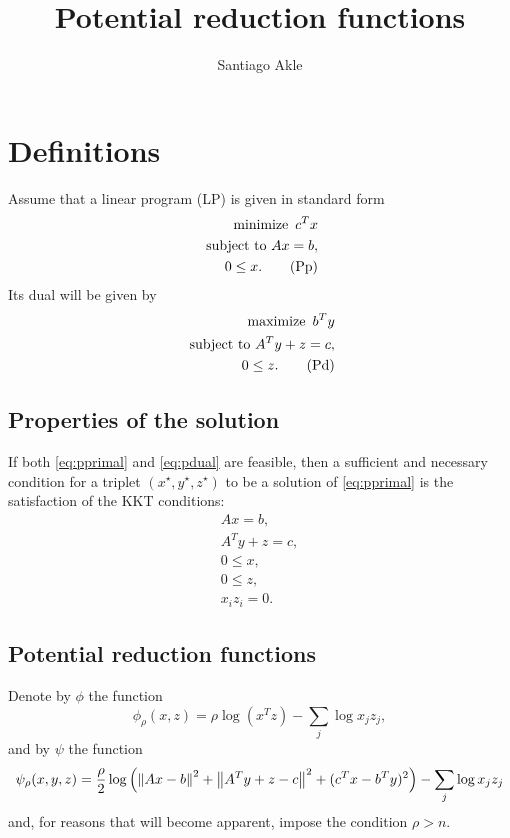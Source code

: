 \documentclass{article}
\title{Potential reduction functions}
\author{Santiago Akle}
\begin{document}
\maketitle
\section{Definitions}
Assume that a linear program (LP) is given in standard form
\begin{align*}
  \operatorname{minimize}\  c^Tx\\
  \text{ subject to } Ax = b,\\
  0 \leq x.
  \label{eq:pprimal}
  \tag{Pp}
\end{align*}
Its dual will be given by  
\begin{align*}
  \operatorname{maximize}\  b^Ty\\
  \text{ subject to } A^Ty + z = c,\\
  0 \leq z.
  \label{eq:pdual}
  \tag{Pd}
\end{align*}

\subsection{Properties of the solution}
If both \eqref{eq:pprimal} and \eqref{eq:pdual} are
feasible, then a sufficient and necessary condition 
for a triplet $(x^\star,y^\star,z^\star)$ to be a solution of \eqref{eq:pprimal}
is the satisfaction of the KKT conditions:
\begin{eqnarray*} 
  Ax = b,\\
  A^Ty + z = c,\\
  0\leq x, \\
  0\leq z, \\
  x_iz_i = 0.
  \label{eq:kkt}
\end{eqnarray*}

\subsection{Potential reduction functions}
Denote by $\phi$ the function
\begin{equation*}
  \phi_\rho(x,z) = \rho\log(x^Tz) -\sum_j\log{x_jz_j},
  \label{eq:phi}
\end{equation*}
and by $\psi$ the function
\begin{equation*}
  \psi_\rho(x,y,z) = \frac{\rho}{2}\log\left(\left\| Ax-b \right\|^2+\left\| A^Ty+z-c \right\|^2 + (c^Tx-b^Ty)^2\right) -\sum_j\log{x_jz_j}
  \label{eq:psi}
\end{equation*}
and, for reasons that will become apparent, impose the condition $\rho >n$.
\end{document}
